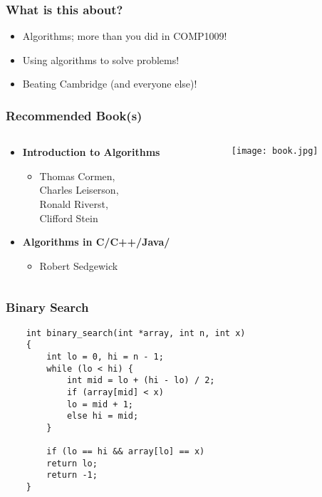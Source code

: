 \documentclass{beamer}
\begin{document}
\begin{frame}
    \frametitle{What is this about?}
    \begin{itemize}
            \pause
        \item Algorithms; more than you did in COMP1009!
            \pause
        \item Using algorithms to solve problems!
            \pause
        \item Beating Cambridge (and everyone else)!
    \end{itemize}
\end{frame}

\begin{frame}
    \frametitle{Recommended Book(s)}
    \begin{columns}[t]
        \begin{column}[T]{5cm}
            \begin{itemize}
                \item \textbf{Introduction to Algorithms}
                    \begin{itemize}
                        \item Thomas Cormen,\\ Charles Leiserson,\\ Ronald Riverst,\\ Clifford Stein
                    \end{itemize}
                \item \textbf{Algorithms in C/C++/Java/}
                    \begin{itemize}
                        \item Robert Sedgewick
                    \end{itemize}
            \end{itemize}
        \end{column}
        \begin{column}[T]{5cm}
            \texttt{[image: book.jpg]}
        \end{column}
    \end{columns}
\end{frame}

\begin{frame}[fragile]
    \frametitle{Binary Search}
    \lstset{language=C}
    \begin{lstlisting}
    int binary_search(int *array, int n, int x)
    {
        int lo = 0, hi = n - 1;
        while (lo < hi) {
            int mid = lo + (hi - lo) / 2;
            if (array[mid] < x)
            lo = mid + 1;
            else hi = mid;
        }

        if (lo == hi && array[lo] == x)
        return lo;
        return -1;
    }
    \end{lstlisting}
\end{frame}
\end{document}
